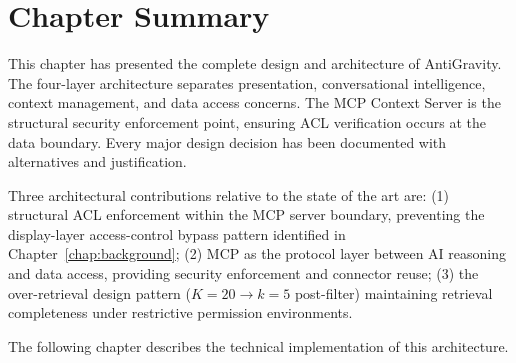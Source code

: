 \section{Chapter Summary}
\label{sec:arch-summary}

This chapter has presented the complete design and architecture of AntiGravity. The four-layer architecture separates presentation, conversational intelligence, context management, and data access concerns. The MCP Context Server is the structural security enforcement point, ensuring ACL verification occurs at the data boundary. Every major design decision has been documented with alternatives and justification.

Three architectural contributions relative to the state of the art are: (1) structural ACL enforcement within the MCP server boundary, preventing the display-layer access-control bypass pattern identified in Chapter~\ref{chap:background}; (2) MCP as the protocol layer between AI reasoning and data access, providing security enforcement and connector reuse; (3) the over-retrieval design pattern ($K = 20 \to k = 5$ post-filter) maintaining retrieval completeness under restrictive permission environments.

The following chapter describes the technical implementation of this architecture.
